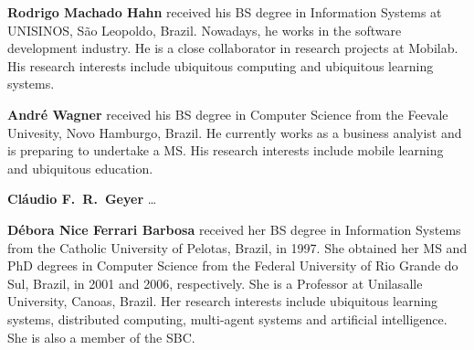 \documentclass[5p,authoryear]{elsarticle}
\begin{document}
\vspace{2mm}
\noindent
\textbf{Rodrigo Machado Hahn} received his BS degree in Information Systems at
UNISINOS, S\~{a}o Leopoldo, Brazil. Nowadays, he works in the software
development industry.  He is a close collaborator in research projects at
Mobilab. His research interests include ubiquitous computing and ubiquitous
learning systems.

\vspace{2mm}
\noindent
\textbf{Andr\'{e} Wagner} received his BS degree in Computer Science from the
Feevale Univesity, Novo Hamburgo, Brazil. He currently works as a business 
analyist and is preparing to undertake a MS. His research interests include
mobile learning and ubiquitous education.

\vspace{2mm}
\noindent
\textbf{Cl\'{a}udio F.~R.~Geyer} \ldots

\vspace{2mm}
\noindent
\textbf{D\'{e}bora Nice Ferrari Barbosa} received her BS degree in Information
Systems from the Catholic University of Pelotas, Brazil, in 1997. She obtained
her MS and PhD degrees in Computer Science from the Federal University of Rio
Grande do Sul, Brazil, in 2001 and 2006, respectively. She is a Professor at
Unilasalle University, Canoas, Brazil. Her research interests include
ubiquitous learning systems, distributed computing, multi-agent systems and
artificial intelligence. She is also a member of the SBC.
\end{document}
